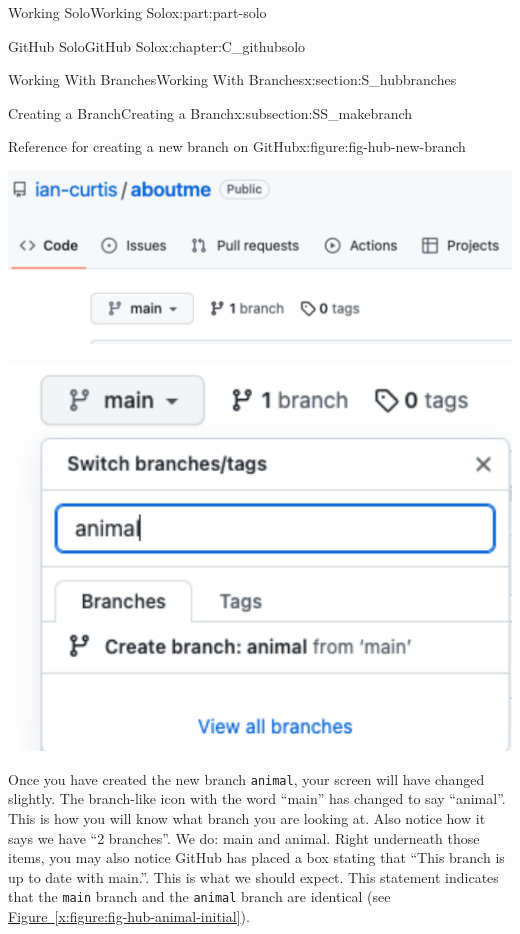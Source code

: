 \documentclass[oneside,10pt,]{book}
\newcommand{\xreffont}{\relax}
\newcommand{\mono}[1]{\texttt{#1}}
\begin{document}
\begin{partptx}{Working Solo}{}{Working Solo}{}{}{x:part:part-solo}
\begin{chapterptx}{GitHub Solo}{}{GitHub Solo}{}{}{x:chapter:C_githubsolo}
\begin{sectionptx}{Working With Branches}{}{Working With Branches}{}{}{x:section:S_hubbranches}
\begin{subsectionptx}{Creating a Branch}{}{Creating a Branch}{}{}{x:subsection:SS_makebranch}
\begin{figureptx}{Reference for creating a new branch on GitHub}{x:figure:fig-hub-new-branch}{}
\begin{sidebyside}{2}{0}{0}{0}%
\begin{sbspanel}{0.5}%
\includegraphics[width=\linewidth]{external/hub_new_branch.pdf}
\end{sbspanel}%
\begin{sbspanel}{0.5}%
\includegraphics[width=\linewidth]{external/hub_new_branch_animal.pdf}
\end{sbspanel}%
\end{sidebyside}%
\tcblower
\end{figureptx}%
Once you have created the new branch \mono{animal}, your screen will have changed slightly. The branch-like icon with the word ``main'' has changed to say ``animal''. This is how you will know what branch you are looking at. Also notice how it says we have ``2 branches''. We do: main and animal. Right underneath those items, you may also notice GitHub has placed a box stating that ``This branch is up to date with main.''. This is what we should expect. This statement indicates that the \mono{main} branch and the \mono{animal} branch are identical (see \hyperref[x:figure:fig-hub-animal-initial]{Figure~{\xreffont\ref{x:figure:fig-hub-animal-initial}}}).%

\end{subsectionptx}
\end{sectionptx}
\end{chapterptx}
\end{partptx}
\end{document}
